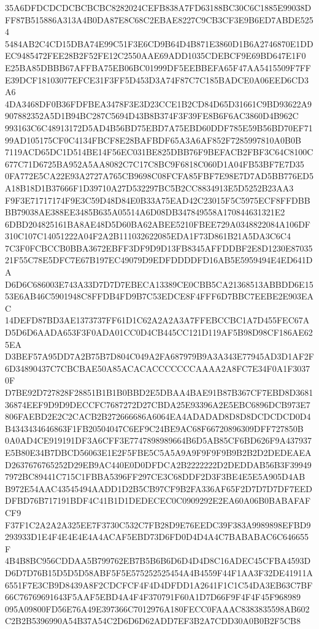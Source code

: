 \documentclass[UTF8,fontset=fandol,zihao=-4,a4paper]{ctexart}
\begin{document}
{{35A6DFDCDCDCBCBCBC8282024CEFB838A7FD63188BC30C6C1885E99038DFF87B515886A313A4B0DA87E8C68C2EBAE8227C9CB3CF3E9B6ED7ABDE5254
5484AB2C4CD15DBA74E99C51F3E6CD9B64D4B871E3860D1B6A2746870E1DDEC9485472FEE28B2F52FE12C2550AAE69ADD1035CDEBCF9E69BD647E1F0
E25BA85DBBB67AFFBA75EB06BC01999DF5EEBBEFA65F47AA5415509F7FFE39DCF18103077EFCE31F3FF5D453D3A74F87C7C185BADCE0A06EED6CD3A6
4DA3468DF0B36FDFBEA3478F3E3D23CCE1B2CD84D65D31661C9BD93622A9907882352A5D1B94BC287C5694D43B8B374F3F39FE8B6F6AC3860D4B962C
993163C6C48913172D5AD4B56BD75EBD7A75EBD60DDF785E59B56BD70EF7199AD105175CF0C4134FBCF8E28BAFBDF65A3A6AF852F7285997810A0B0B
7119ACD65DC1D514BE14F56EC031BE825DBB76F9BEFACB2FBF3C64C8100C677C71D6725BA952A5AA8082C7C17C8BC9F6818C060D1A04FB53BF7E7D35
0FA772E5CA22E93A2727A765CB9698C08FCFA85FBF7E98E7D7AD5BB776ED5A18B18D1B37666F1D39710A27D532297BC5B2CC8834913E5D5252B23AA3
F9F3E71717174F9E3C59D48D84E0B33A75EAD42C23015F5C5975ECF8FFDBBBB79038AE388EE3485B635A05514A6D08DB347849558A170844631321E2
6DBD204825161BA8AE48D5D60BA62ABEE5210FBEE729A0348822084A106DF310C107C14051222A04F2A2B111032622085EDA1F73D861B21A5DA3C6C4
7C3F0FCBCCB0BBA3672EBFF3DF9D9D13FB8345AFFDDBF2E8D1230E8703521F55C78E5DFC7E67B197EC49079D9EDFDDDDFD16AB5E5959494E4ED641DA
D6D6C686003E743A33D7D7D7EBECA13389CE0CBB5CA21368513ABBDD6E1553E6AB46C5901948C8FFDB4FD9B7C53EDCE8F4FFF6D7BBC7EEBE2E903EAC
14DEFD87BD3AE1373737FF61D1C62A2A2A3A7FFEBCCBC1A7D455FEC67AD5D6D6AADA653F3F0ADA01CC0D4CB445CC121D119AF5B98D98CF186AE625EA
D3BEF57A95DD7A2B75B7D804C049A2FA687979B9A3A343E77945AD3D1AF2F6D34890437C7CBCBAE50A85ACACACCCCCCCAAAA2A8FC7E34F0A1F30370F
D7BE92D727828F28851B1B1B0BBD2E5DBAA4BAE91B87B367CF7EBD8D368136874EEF9D9D9DECCFC7687272D27CBDA25E93396A2E5EBC6896DCB973E7
806FAEBD2E2C2CACB2B272666686A6064EA4ADADAD8D8D8DCDCDCD0D4B4343434646863F1FB20504047C6EF9C24BE9AC68F66720896309DFF727850B
0A0AD4CE919191DF3A6CFF3E7747898989664B6D5AB85CF6BD626F9A437937E5B80E34B7DBCD56063E1E2F5FBE5C5A5A9A9F9F9F9B9B2B2D2DEDEAEA
D2637676765252D29EB9AC440E0D0DFDCA2B2222222D2DEDDAB56B3F399497972BC89441C715C1FBBA5396FF297CE3C68DDF2D3F3BE4E5E5A905D4AB
B972E54AAC43545494AADD1D2B5CB97CF9B2FA336AF65F2D7D7D7DF7EEDDFBD76B717191BDF4C41B1D1DEDECEC0C0909292E2EA60A06B0BABAFAFCF9
F37F1C2A2A2A325EE7F3730C532C7FB28D9E76EEDC39F383A9989898EFBD9293933D1E4F4E4E4E4A4ACAF5EBD73D6FD0D4D4A4C7BABABAC6C646655F
4B4B8BC956CDDAA5B799762EB7B5B6B6D6D4D4D8C16ADEC45CFBA4593DD6D7D76B15D5D5D58ABF5F5E575252525454A4B4559F44F1AA3F32DE41911A
6551F7E3CB9D8439A8F2CDCFCF4F4D4DFDD1A2641F1C1C54DA3EB63C7BF66C76769691643F5AAF5EBD4A4F4F370791F60A1D7D66F9F4F4F45F968989
095A09800FD56E76A49E397366C7012976A180FECC0FAAAC8383835598AB602C2B2B5396990A54B37A54C2D6D6D62ADD7EF3B2A7CDD30A0B0B2F5CB8
}}
\end{document}
